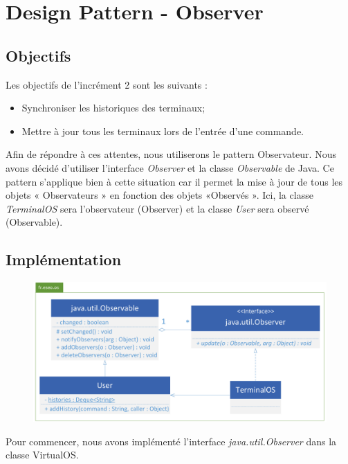 \newpage
\section{Design Pattern - Observer}

\subsection{Objectifs}

Les objectifs de l'incrément 2 sont les suivants :\\

\begin{itemize}
\item Synchroniser les historiques des terminaux;
\item Mettre à jour tous les terminaux lors de l'entrée d'une commande.\\
\end{itemize}

Afin de répondre à ces attentes, nous utiliserons le pattern Observateur. Nous avons décidé d’utiliser l’interface \emph{Observer} et la classe \emph{Observable} de Java. Ce pattern s’applique bien à cette situation car il permet la mise à jour de tous les objets « Observateurs » en fonction des objets «Observés ». Ici, la classe \emph{TerminalOS} sera l’observateur (Observer) et la classe \emph{User} sera observé (Observable).

\subsection{Implémentation}

\begin{figure}[!h]
\centering
\includegraphics[width=\textwidth]{../uml/uml-observer}
\end{figure}

Pour commencer, nous avons implémenté l'interface \emph{java.util.Observer} dans la classe VirtualOS. 

